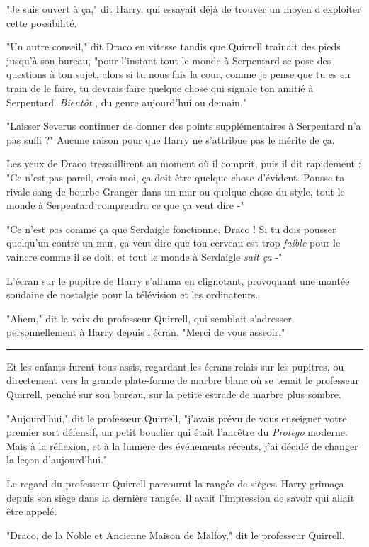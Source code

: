 "Je suis ouvert à ça," dit Harry, qui essayait déjà de trouver un moyen d'exploiter cette possibilité.

"Un autre conseil," dit Draco en vitesse tandis que Quirrell traînait des pieds jusqu'à son bureau, "pour l'instant tout le monde à Serpentard se pose des questions à ton sujet, alors si tu nous fais la cour, comme je pense que tu es en train de le faire, tu devrais faire quelque chose qui signale ton amitié à Serpentard. \emph{Bientôt} , du genre aujourd'hui ou demain."

"Laisser Severus continuer de donner des points supplémentaires à Serpentard n'a pas suffi ?" Aucune raison pour que Harry ne s'attribue pas le mérite de ça.

Les yeux de Draco tressaillirent au moment où il comprit, puis il dit rapidement : "Ce n'est pas pareil, crois-moi, ça doit être quelque chose d'évident. Pousse ta rivale sang-de-bourbe Granger dans un mur ou quelque chose du style, tout le monde à Serpentard comprendra ce que ça veut dire -"

"Ce n'est \emph{pas}  comme ça que Serdaigle fonctionne, Draco ! Si tu dois pousser quelqu'un contre un mur, ça veut dire que ton cerveau est trop \emph{faible}  pour le vaincre comme il se doit, et tout le monde à Serdaigle \emph{sait ça}  -"

L'écran sur le pupitre de Harry s'alluma en clignotant, provoquant une montée soudaine de nostalgie pour la télévision et les ordinateurs.

"Ahem," dit la voix du professeur Quirrell, qui semblait s'adresser personnellement à Harry depuis l'écran. "Merci de vous asseoir."
\par\noindent\rule{\textwidth}{0.4pt}
Et les enfants furent tous assis, regardant les écrans-relais sur les pupitres, ou directement vers la grande plate-forme de marbre blanc où se tenait le professeur Quirrell, penché sur son bureau, sur la petite estrade de marbre plus sombre.

"Aujourd'hui," dit le professeur Quirrell, "j'avais prévu de vous enseigner votre premier sort défensif, un petit bouclier qui était l'ancêtre du \emph{Protego}  moderne. Mais à la réflexion, et à la lumière des événements récents, j'ai décidé de changer la leçon d'aujourd'hui."

Le regard du professeur Quirrell parcourut la rangée de sièges. Harry grimaça depuis son siège dans la dernière rangée. Il avait l'impression de savoir qui allait être appelé.

"Draco, de la Noble et Ancienne Maison de Malfoy," dit le professeur Quirrell.

